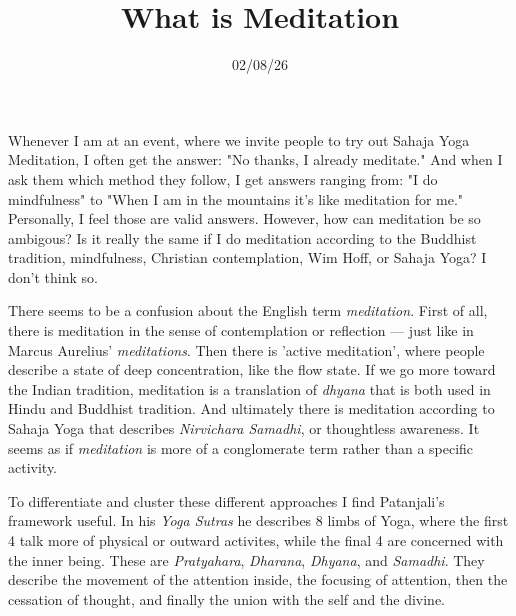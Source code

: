 \documentclass[12pt]{article}
\title{What is Meditation}
\date{02/08/26}
\begin{document}
\maketitle

Whenever I am at an event, where we invite people to try out Sahaja Yoga Meditation, I often get the answer: "No thanks, I already meditate."
And when I ask them which method they follow, I get answers ranging from: "I do mindfulness" to "When I am in the mountains it's like meditation for me."
Personally, I feel those are valid answers.
However, how can meditation be so ambigous?
Is it really the same if I do meditation according to the Buddhist tradition, mindfulness, Christian contemplation, Wim Hoff, or Sahaja Yoga?
I don't think so.

There seems to be a confusion about the English term \textit{meditation}.
First of all, there is meditation in the sense of contemplation or reflection --- just like in Marcus Aurelius' \textit{meditations}.
Then there is 'active meditation', where people describe a state of deep concentration, like the flow state.
If we go more toward the Indian tradition, meditation is a translation of \textit{dhyana} that is both used in Hindu and Buddhist tradition.
And ultimately there is meditation according to Sahaja Yoga that describes \textit{Nirvichara Samadhi}, or thoughtless awareness.
It seems as if \textit{meditation} is more of a conglomerate term rather than a specific activity.

To differentiate and cluster these different approaches I find Patanjali's framework useful.
In his \textit{Yoga Sutras} he describes 8 limbs of Yoga, where the first 4 talk more of physical or outward activites, while the final 4 are concerned with the inner being.
These are \textit{Pratyahara}, \textit{Dharana}, \textit{Dhyana}, and \textit{Samadhi}.
They describe the movement of the attention inside, the focusing of attention, then the cessation of thought, and finally the union with the self and the divine.
\end{document}

